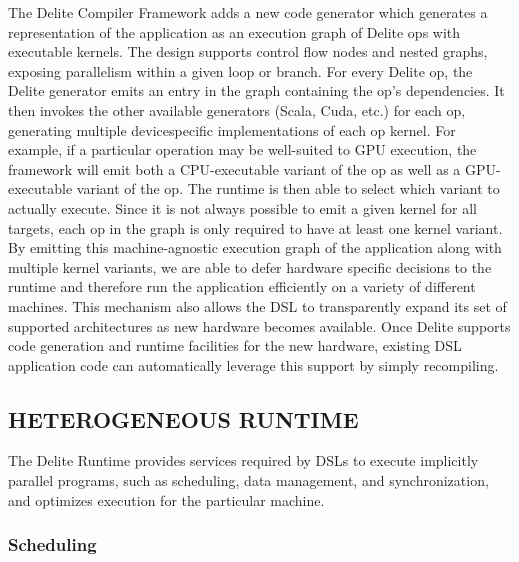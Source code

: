 The Delite Compiler Framework adds a new code generator
which generates a representation of the application as an execution graph of Delite ops with executable kernels. The design
supports control flow nodes and nested graphs, exposing parallelism within a given loop or branch. For every Delite op, the
Delite generator emits an entry in the graph containing the op’s
dependencies. It then invokes the other available generators
(Scala, Cuda, etc.) for each op, generating multiple devicespecific implementations of each op kernel. For example, if
a particular operation may be well-suited to GPU execution,
the framework will emit both a CPU-executable variant of
the op as well as a GPU-executable variant of the op. The
runtime is then able to select which variant to actually execute.
Since it is not always possible to emit a given kernel for
all targets, each op in the graph is only required to have at
least one kernel variant. By emitting this machine-agnostic
execution graph of the application along with multiple kernel
variants, we are able to defer hardware specific decisions to
the runtime and therefore run the application efficiently on a
variety of different machines. This mechanism also allows the
DSL to transparently expand its set of supported architectures
as new hardware becomes available. Once Delite supports code
generation and runtime facilities for the new hardware, existing
DSL application code can automatically leverage this support
by simply recompiling.


\subsection{HETEROGENEOUS RUNTIME}

The Delite Runtime provides services required by DSLs to
execute implicitly parallel programs, such as scheduling, data
management, and synchronization, and optimizes execution for
the particular machine.


\subsubsection{Scheduling}


